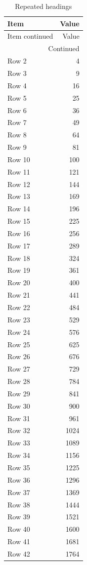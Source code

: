 \documentclass{article}
\begin{document}
\begin{longtable}{lr}\caption{Repeated headings}\label{tab:long}\\\toprule Item&Value\\\midrule\endfirsthead
\toprule Item continued&Value\\\midrule\endhead
\midrule\multicolumn{2}{r}{Continued}\endfoot\bottomrule\endlastfoot
Row 1&1\\
Row 2&4\\
Row 3&9\\
Row 4&16\\
Row 5&25\\
Row 6&36\\
Row 7&49\\
Row 8&64\\
Row 9&81\\
Row 10&100\\
Row 11&121\\
Row 12&144\\
Row 13&169\\
Row 14&196\\
Row 15&225\\
Row 16&256\\
Row 17&289\\
Row 18&324\\
Row 19&361\\
Row 20&400\\
Row 21&441\\
Row 22&484\\
Row 23&529\\
Row 24&576\\
Row 25&625\\
Row 26&676\\
Row 27&729\\
Row 28&784\\
Row 29&841\\
Row 30&900\\
Row 31&961\\
Row 32&1024\\
Row 33&1089\\
Row 34&1156\\
Row 35&1225\\
Row 36&1296\\
Row 37&1369\\
Row 38&1444\\
Row 39&1521\\
Row 40&1600\\
Row 41&1681\\
Row 42&1764\\

\end{longtable}
\end{document}
